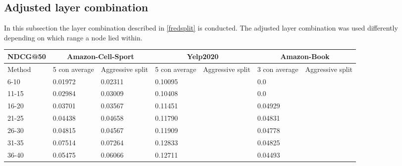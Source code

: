 \subsection{Adjusted layer combination}\label{app:adjusted-layer-combi}
In this subsection the layer combination described in \autoref{fredsplit} is conducted.
The adjusted layer combination was used differently depending on which range a node lied within.

\begin{table*}[h!]
    \centering
    \begin{tabular}{|l|l|l||l|l||l|l|}
        \hline
        NDCG@50   & \multicolumn{2}{c||}{Amazon-Cell-Sport} & \multicolumn{2}{c||}{Yelp2020} & \multicolumn{2}{c|}{Amazon-Book}                                                       \\ \hline
        Method    & 5 con average                           & Aggressive split               & 5 con average                    & Aggressive split & 3 con average & Aggressive split \\ \hline
        6-10      & 0.01972                                 & 0.02311                               & 0.10095                          &                  & 0.0           &                  \\ \hline
        11-15     & 0.02984                                 & 0.03009                               & 0.10408                          &                  & 0.0           &                  \\ \hline
        16-20     & 0.03701                                 & 0.03567                               & 0.11451                          &                  & 0.04929       &                  \\ \hline
        21-25     & 0.04438                                 & 0.04658                               & 0.11790                          &                  & 0.04831       &                  \\ \hline
        26-30     & 0.04815                                 & 0.04567                               & 0.11909                          &                  & 0.04778       &                  \\ \hline
        31-35     & 0.07514                                 & 0.07264                               & 0.12833                          &                  & 0.04825       &                  \\ \hline
        36-40     & 0.05475                                 & 0.06066                               & 0.12711                          &                  & 0.04493       &                  \\ \hline

\end{tabular}
\end{table*}
